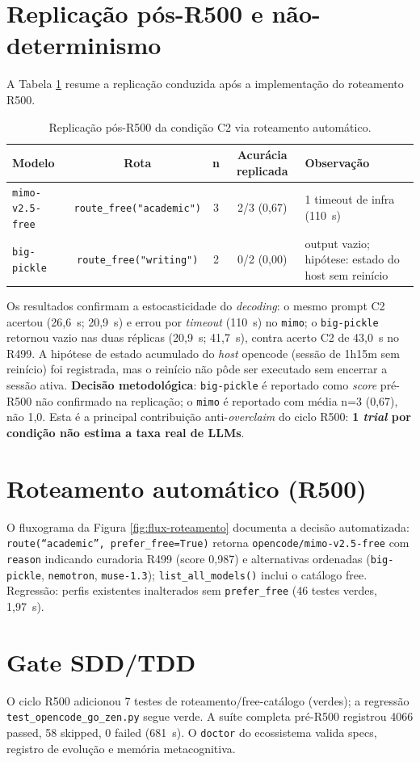 \section{Replicação pós-R500 e não-determinismo}

A Tabela \ref{tab:repl} resume a replicação conduzida após a implementação do
roteamento R500.

\begin{table}[htbp]
\centering
\caption{Replicação pós-R500 da condição C2 via roteamento automático.}
\label{tab:repl}
\begin{tabular}{lcccl}
\toprule
Modelo & Rota & n & Acurácia replicada & Observação \\
\midrule
\texttt{mimo-v2.5-free}   & \texttt{route\_free("academic")} & 3 & 2/3 (0,67) & 1 timeout de infra (110~s) \\
\texttt{big-pickle}       & \texttt{route\_free("writing")}  & 2 & 0/2 (0,00) & output vazio; hipótese: estado do host sem reinício \\
\bottomrule
\end{tabular}
\end{table}

Os resultados confirmam a estocasticidade do \textit{decoding}: o mesmo prompt
C2 acertou (26,6~s; 20,9~s) e errou por \textit{timeout} (110~s) no
\texttt{mimo}; o \texttt{big-pickle} retornou vazio nas duas réplicas
(20,9~s; 41,7~s), contra acerto C2 de 43,0~s no R499. A hipótese de estado
acumulado do \textit{host} opencode (sessão de 1h15m sem reinício) foi
registrada, mas o reinício não pôde ser executado sem encerrar a sessão
ativa. \textbf{Decisão metodológica}: \texttt{big-pickle} é reportado como
\textit{score} pré-R500 não confirmado na replicação; o \texttt{mimo} é
reportado com média n=3 (0,67), não 1,0. Esta é a principal contribuição
anti-\textit{overclaim} do ciclo R500: \textbf{1 \textit{trial} por condição
não estima a taxa real de LLMs}.

\section{Roteamento automático (R500)}

O fluxograma da Figura \ref{fig:flux-roteamento} documenta a decisão
automatizada: \texttt{route(``academic'', prefer\_free=True)} retorna
\texttt{opencode/mimo-v2.5-free} com \texttt{reason} indicando curadoria R499
(score 0,987) e alternativas ordenadas (\texttt{big-pickle}, \texttt{nemotron},
\texttt{muse-1.3}); \texttt{list\_all\_models()} inclui o catálogo free.
Regressão: perfis existentes inalterados sem \texttt{prefer\_free} (46 testes
verdes, 1,97~s).



\section{Gate SDD/TDD}

O ciclo R500 adicionou 7 testes de roteamento/free-catálogo (verdes); a
regressão \texttt{test\_opencode\_go\_zen.py} segue verde. A suíte completa
pré-R500 registrou 4066 passed, 58 skipped, 0 failed (681~s). O
\texttt{doctor} do ecossistema valida specs, registro de evolução e memória
metacognitiva.